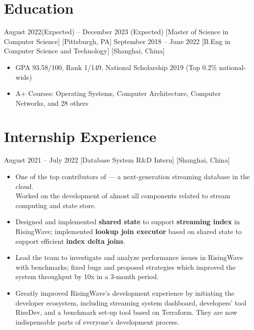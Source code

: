 \documentclass{chicv}
\begin{document}
\begin{basicinfo}
\end{basicinfo}

\section{Education}
  {August 2022(Expected) -- December 2023 (Expected)}
  [Master of Science in Computer Science]
  [Pittsburgh, PA]
  {September 2018 -- June 2022}
  [B.Eng in Computer Science and Technology]
  [Shanghai, China]
  \begin{itemize}
    \item GPA 93.58/100, Rank 1/149, National Scholarship 2019 (Top 0.2\% national-wide)
    \item A+ Courses: Operating Systems, Computer Architecture, Computer Networks, and 28 others
  \end{itemize}

\section{Internship Experience}

  {August 2021 – July 2022}
  [Database System R\&D Intern]
  [Shanghai, China]

\begin{itemize}
  \item One of the top contributors of  — a next-generation streaming database in the cloud. \\ Worked on the development of almost all components related to stream computing and state store.
  \item Designed and implemented \textbf{shared state} to support \textbf{streaming index} in RisingWave; implemented \textbf{lookup join executor} based on shared state to support efficient \textbf{index delta joins}.
  \item Lead the team to investigate and analyze performance issues in RisingWave with benchmarks; fixed bugs and proposed strategies which improved the system throughput by 10x in a 3-month period.
  \item Greatly improved RisingWave’s development experience by initiating the developer ecosystem, including streaming system dashboard, developers’ tool RiseDev, and a benchmark set-up tool based on Terraform. They are now indispensable parts of everyone’s development process.
\end{itemize}
\end{document}

